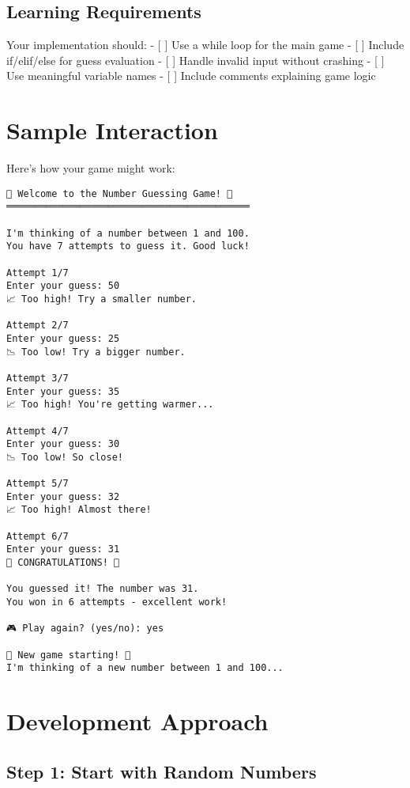 \documentclass[
  letterpaper,
  DIV=11,
  numbers=noendperiod,
  oneside]{scrreprt}
\begin{document}
\subsection{Learning Requirements}\label{learning-requirements-2}

Your implementation should: - {[} {]} Use a while loop for the main game
- {[} {]} Include if/elif/else for guess evaluation - {[} {]} Handle
invalid input without crashing - {[} {]} Use meaningful variable names -
{[} {]} Include comments explaining game logic

\section{Sample Interaction}\label{sample-interaction-2}

Here's how your game might work:

\begin{verbatim}
🎯 Welcome to the Number Guessing Game! 🎯
═══════════════════════════════════════════

I'm thinking of a number between 1 and 100.
You have 7 attempts to guess it. Good luck!

Attempt 1/7
Enter your guess: 50
📈 Too high! Try a smaller number.

Attempt 2/7  
Enter your guess: 25
📉 Too low! Try a bigger number.

Attempt 3/7
Enter your guess: 35
📈 Too high! You're getting warmer...

Attempt 4/7
Enter your guess: 30
📉 Too low! So close!

Attempt 5/7
Enter your guess: 32
📈 Too high! Almost there!

Attempt 6/7
Enter your guess: 31
🎉 CONGRATULATIONS! 🎉

You guessed it! The number was 31.
You won in 6 attempts - excellent work!

🎮 Play again? (yes/no): yes

🎯 New game starting! 🎯
I'm thinking of a new number between 1 and 100...
\end{verbatim}

\section{Development Approach}\label{development-approach-2}

\subsection{Step 1: Start with Random
Numbers}\label{step-1-start-with-random-numbers}
\end{document}
